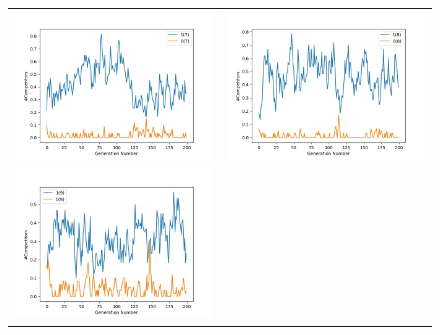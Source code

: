 \documentclass{article}
\begin{document}
\begin{figure}[H]
\begin{adjustbox}{width=0.6\paperwidth}
\begin{tabular}{c c}
				\includegraphics{Codes/Problem_1 Construction_1/Comp_7.jpg} & \includegraphics{Codes/Problem_1 Construction_1/Comp_8.jpg} \\
				\includegraphics{Codes/Problem_1 Construction_1/Comp_9.jpg}&

\end{tabular}
\end{adjustbox}
\end{figure}
\end{document}
